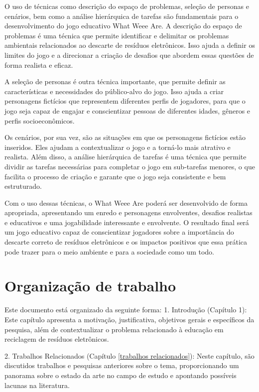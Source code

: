 O uso de técnicas como descrição do espaço de problemas, seleção de personas e cenários, bem como a análise hierárquica de tarefas são fundamentais para o desenvolvimento do jogo educativo What Weee Are. A descrição do espaço de problemas é uma técnica que permite identificar e delimitar os problemas ambientais relacionados ao descarte de resíduos eletrônicos. Isso ajuda a definir os limites do jogo e a direcionar a criação de desafios que abordem essas questões de forma realista e eficaz.

A seleção de personas é outra técnica importante, que permite definir as características e necessidades do público-alvo do jogo. Isso ajuda a criar personagens fictícios que representem diferentes perfis de jogadores, para que o jogo seja capaz de engajar e conscientizar pessoas de diferentes idades, gêneros e perfis socioeconômicos.

Os cenários, por sua vez, são as situações em que os personagens fictícios estão inseridos. Eles ajudam a contextualizar o jogo e a torná-lo mais atrativo e realista. Além disso, a análise hierárquica de tarefas é uma técnica que permite dividir as tarefas necessárias para completar o jogo em sub-tarefas menores, o que facilita o processo de criação e garante que o jogo seja consistente e bem estruturado.

Com o uso dessas técnicas, o What Weee Are poderá ser desenvolvido de forma apropriada, apresentando um enredo e personagens envolventes, desafios realistas e educativos e uma jogabilidade interessante e envolvente. O resultado final será um jogo educativo capaz de conscientizar jogadores sobre a importância do descarte correto de resíduos eletrônicos e os impactos positivos que essa prática pode trazer para o meio ambiente e para a sociedade como um todo.


\section{Organização de trabalho}
Este documento está organizado da seguinte forma:
1. Introdução (Capítulo 1): Este capítulo apresenta a motivação, justificativa, objetivos gerais e específicos da pesquisa, além de contextualizar o problema relacionado à educação em reciclagem de resíduos eletrônicos.

2. Trabalhos Relacionados (Capítulo \ref{trabalhos relacionados}): Neste capítulo, são discutidos trabalhos e pesquisas anteriores sobre o tema, proporcionando um panorama sobre o estado da arte no campo de estudo e apontando possíveis lacunas na literatura.

